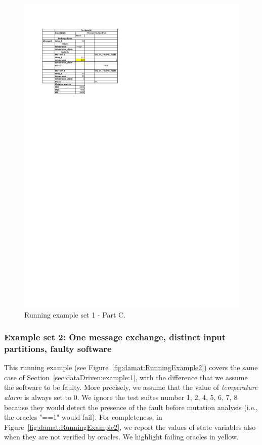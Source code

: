 \begin{figure}[tb]
\centering
\includegraphics[width=18cm]{damat/DataDrivenExample1C}
\caption{Running example set 1 - Part C.}
\label{fig:damat:RunningExample1C}
\end{figure}

%

\clearpage

\subsubsection{Example set 2: One message exchange, distinct input partitions, faulty software}
\label{sec:dataDriven:example:2}

This running example (see Figure~\ref{fig:damat:RunningExample2}) covers the same case of Section~\ref{sec:dataDriven:example:1}, with the difference that we assume the software to be faulty. More precisely, we assume that the value of \emph{temperature alarm} is always set to 0. We ignore the test suites number 1, 2, 4, 5, 6, 7, 8 because they would detect the presence of the fault before mutation analysis (i.e., the oracles "==1" would fail). For completeness, in Figure~\ref{fig:damat:RunningExample2}, we report the values of state variables also when they are not verified by oracles. We highlight failing oracles in yellow.

